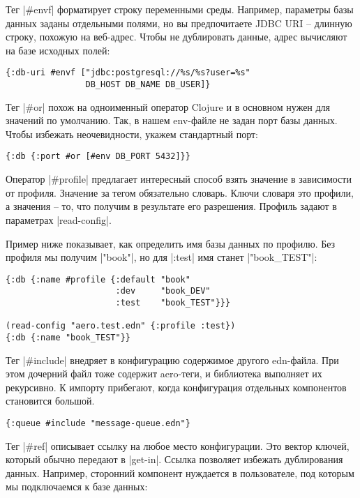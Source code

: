 Тег \spverb|#envf| форматирует строку переменными среды. Например, параметры базы
данных заданы отдельными полями, но вы предпочитаете JDBC URI -- длинную строку,
похожую на веб-адрес. Чтобы не дублировать данные, адрес вычисляют на базе
исходных полей:

\begin{verbatim}
{:db-uri #envf ["jdbc:postgresql://%s/%s?user=%s"
                DB_HOST DB_NAME DB_USER]}
\end{verbatim}

Тег \spverb|#or| похож на одноименный оператор Clojure и в основном нужен для значений
по умолчанию. Так, в нашем env-файле не задан порт базы данных. Чтобы избежать
неочевидности, укажем стандартный порт:

\begin{verbatim}
{:db {:port #or [#env DB_PORT 5432]}}
\end{verbatim}

Оператор \spverb|#profile| предлагает интересный способ взять значение в зависимости от
профиля. Значение за тегом обязательно словарь. Ключи словаря это профили, а
значения -- то, что получим в результате его разрешения. Профиль задают в
параметрах \spverb|read-config|.

Пример ниже показывает, как определить имя базы данных по профилю. Без профиля
мы получим \spverb|"book"|, но для \spverb|:test| имя станет \spverb|"book_TEST"|:

\begin{verbatim}
{:db {:name #profile {:default "book"
                      :dev     "book_DEV"
                      :test    "book_TEST"}}}

(read-config "aero.test.edn" {:profile :test})
{:db {:name "book_TEST"}}
\end{verbatim}

Тег \spverb|#include| внедряет в конфигурацию содержимое другого edn-файла. При этом
дочерний файл тоже содержит aero-теги, и библиотека выполняет их рекурсивно. К
импорту прибегают, когда конфигурация отдельных компонентов становится большой.

\begin{verbatim}
{:queue #include "message-queue.edn"}
\end{verbatim}

Тег \spverb|#ref| описывает ссылку на любое место конфигурации. Это вектор ключей,
который обычно передают в \spverb|get-in|. Ссылка позволяет избежать дублирования
данных. Например, сторонний компонент нуждается в пользователе, под которым мы
подключаемся к базе данных:

